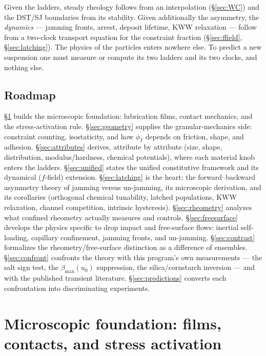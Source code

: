 \documentclass[11pt]{article}
\newcommand{\phiJ}{\phi_{\mathrm{J}}}
\begin{document}
Given the ladders, steady rheology follows from an interpolation (\S\ref{sec:WC}) and the DST/SJ boundaries from its stability. Given additionally the asymmetry, the \emph{dynamics} --- jamming fronts, arrest, deposit lifetime, KWW relaxation --- follow from a two-clock transport equation for the constraint fraction (\S\ref{sec:ffield}, \S\ref{sec:latching}). The physics of the particles enters nowhere else. To predict a new suspension one must measure or compute its two ladders and its two clocks, and nothing else.

\subsection{Roadmap}
\S\ref{sec:micro} builds the microscopic foundation: lubrication films, contact mechanics, and the stress-activation rule. \S\ref{sec:geometry} supplies the granular-mechanics side: constraint counting, isostaticity, and how $\phiJ$ depends on friction, shape, and adhesion. \S\ref{sec:attributes} derives, attribute by attribute (size, shape, distribution, modulus/hardness, chemical potentials), where each material knob enters the ladders. \S\ref{sec:unified} states the unified constitutive framework and its dynamical ($f$-field) extension. \S\ref{sec:latching} is the heart: the forward--backward asymmetry theory of jamming versus un-jamming, its microscopic derivation, and its corollaries (orthogonal chemical tunability, latched populations, KWW relaxation, channel competition, intrinsic hysteresis). \S\ref{sec:rheometry} analyzes what confined rheometry actually measures and controls. \S\ref{sec:freesurface} develops the physics specific to drop impact and free-surface flows: inertial self-loading, capillary confinement, jamming fronts, and un-jamming. \S\ref{sec:contrast} formalizes the rheometry/free-surface distinction as a difference of ensembles. \S\ref{sec:confront} confronts the theory with this program's own measurements --- the salt sign test, the $\beta_{\max}(u_0)$ suppression, the silica/cornstarch inversion --- and with the published transient literature. \S\ref{sec:predictions} converts each confrontation into discriminating experiments.

\section{Microscopic foundation: films, contacts, and stress activation}
\label{sec:micro}
\end{document}

